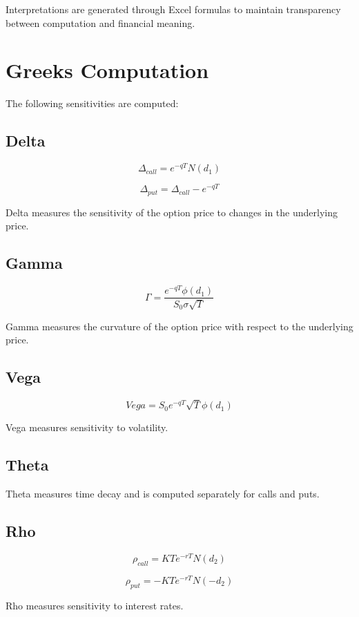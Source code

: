 \documentclass[12pt]{article}
\begin{document}
Interpretations are generated through Excel formulas to maintain transparency between computation and financial meaning.

\section{Greeks Computation}

The following sensitivities are computed:

\subsection*{Delta}

\[
\Delta_{call} = e^{-qT} N(d_1)
\]

\[
\Delta_{put} = \Delta_{call} - e^{-qT}
\]

Delta measures the sensitivity of the option price to changes in the underlying price.

\subsection*{Gamma}

\[
\Gamma =
\frac{e^{-qT} \phi(d_1)}
{S_0 \sigma \sqrt{T}}
\]

Gamma measures the curvature of the option price with respect to the underlying price.

\subsection*{Vega}

\[
Vega =
S_0 e^{-qT} \sqrt{T} \phi(d_1)
\]

Vega measures sensitivity to volatility.

\subsection*{Theta}

Theta measures time decay and is computed separately for calls and puts.

\subsection*{Rho}

\[
\rho_{call} =
K T e^{-rT} N(d_2)
\]

\[
\rho_{put} =
- K T e^{-rT} N(-d_2)
\]

Rho measures sensitivity to interest rates.
\end{document}
